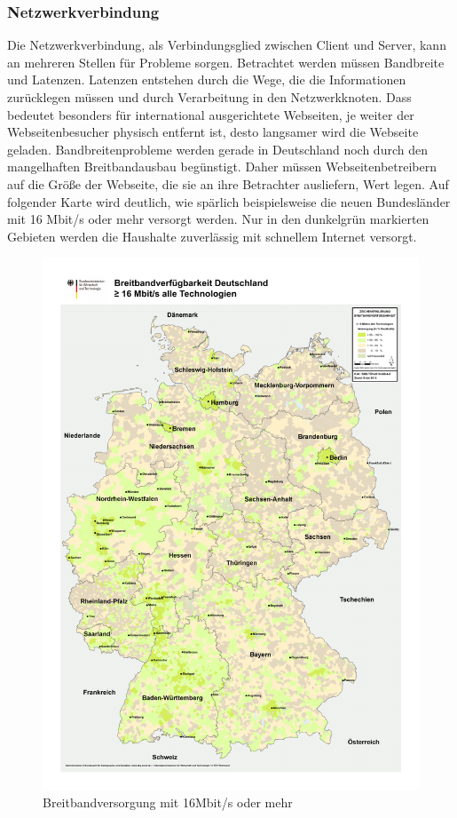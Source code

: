 \subsubsection{Netzwerkverbindung}
Die Netzwerkverbindung, als Verbindungsglied zwischen Client und Server, kann an mehreren Stellen f\"ur Probleme sorgen. Betrachtet werden m\"ussen Bandbreite und Latenzen. Latenzen entstehen durch die Wege, die die Informationen zur\"ucklegen m\"ussen und durch Verarbeitung in den Netzwerkknoten. Dass bedeutet besonders f\"ur international ausgerichtete Webseiten, je weiter der Webseitenbesucher physisch entfernt ist, desto langsamer wird die Webseite geladen. Bandbreitenprobleme werden gerade in Deutschland noch durch den mangelhaften Breitbandausbau beg\"unstigt. Daher m\"ussen Webseitenbetreibern auf die Größe der Webseite, die sie an ihre Betrachter ausliefern, Wert legen. Auf folgender Karte wird deutlich, wie sp\"arlich beispielsweise die neuen Bundesl\"ander mit 16 Mbit/s oder mehr versorgt werden. Nur in den dunkelgrün markierten Gebieten werden die Haushalte zuverlässig mit schnellem Internet versorgt.
\begin{figure}[htbp]
  \centering
  \includegraphics[scale=0.5]{material/breitband201116mbit.pdf}
  \caption{Breitbandversorgung mit 16Mbit/s oder mehr}
  \label{fig:breitband}
\end{figure}
